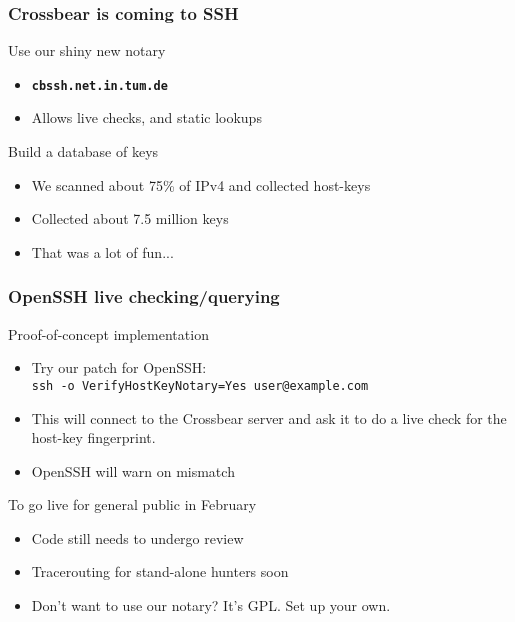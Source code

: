 \begin{frame}
\frametitle{Crossbear is coming to SSH}
\begin{block}{Use our shiny new notary}
\begin{itemize}
  \item {\Large \textbf{\texttt{cbssh.net.in.tum.de}}}
  \item Allows live checks, and static lookups
\end{itemize}
\end{block}
\begin{block}{Build a database of keys}
\begin{itemize}
  \item We scanned about 75\% of IPv4 and collected host-keys
  \item Collected about 7.5 million keys
  \item That was a lot of fun...
\end{itemize}
\end{block}
\end{frame}


\begin{frame}
\frametitle{OpenSSH live checking/querying}
\begin{block}{Proof-of-concept implementation}
\begin{itemize}
  \item Try our patch for OpenSSH: \\
     \texttt{ssh -o VerifyHostKeyNotary=Yes user@example.com}
  \item This will connect to the Crossbear server and ask it to do a live check for the host-key fingerprint.
  \item OpenSSH will warn on mismatch
\end{itemize}
\end{block}
\begin{block}{To go live for general public in February}
\begin{itemize}
  \item Code still needs to undergo review
  \item Tracerouting for stand-alone hunters soon
  \item Don't want to use our notary? It's GPL. Set up your own.
\end{itemize}
\end{block}
\end{frame}


